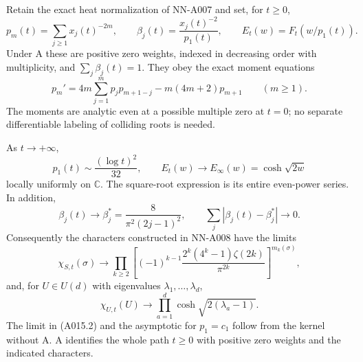 \begin{theorem}
Retain the exact heat normalization of NN-A007 and set, for $t\ge0$,
\[
 p_m(t)=\sum_{j\ge1}x_j(t)^{-2m},\qquad
 \beta_j(t)=\frac{x_j(t)^{-2}}{p_1(t)},\qquad
 E_t(w)=F_t(w/p_1(t)).
\]
Under A these are positive zero weights, indexed in decreasing order
with multiplicity, and $\sum_j\beta_j(t)=1$. They obey the exact
moment equations
\[
 p_m'=4m\sum_{j=1}^{m}p_jp_{m+1-j}-m(4m+2)p_{m+1}
 \qquad(m\ge1).                                      \tag{A015.1}
\]
The moments are analytic even at a possible multiple zero at $t=0$;
no separate differentiable labeling of colliding roots is needed.

As $t\to+\infty$,
\[
 p_1(t)\sim\frac{(\log t)^2}{32},\qquad
 E_t(w)\longrightarrow E_\infty(w)=\cosh\sqrt{2w}
                                                        \tag{A015.2}
\]
locally uniformly on $\mathbb C$. The square-root expression is its
entire even-power series. In addition,
\[
 \beta_j(t)\longrightarrow
 \beta_j^*=\frac{8}{\pi^2(2j-1)^2},\qquad
 \sum_j|\beta_j(t)-\beta_j^*|\longrightarrow0.           \tag{A015.3}
\]
Consequently the characters constructed in NN-A008 have the limits
\[
 \chi_{S,t}(\sigma)\longrightarrow
 \prod_{k\ge2}\left[
 (-1)^{k-1}\frac{2^k(4^k-1)\zeta(2k)}{\pi^{2k}}
 \right]^{m_k(\sigma)},                                \tag{A015.4}
\]
and, for $U\in U(d)$ with eigenvalues $\lambda_1,\ldots,\lambda_d$,
\[
 \chi_{U,t}(U)\longrightarrow
 \prod_{a=1}^d\cosh\sqrt{2(\lambda_a-1)}.                \tag{A015.5}
\]
The limit in (A015.2) and the asymptotic for $p_1=c_1$ follow from
the kernel without A. A identifies the whole path $t\ge0$ with
positive zero weights and the indicated characters.
\end{theorem}


